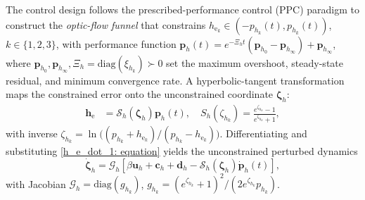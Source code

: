 The control design follows the prescribed-performance control (PPC) paradigm \cite{lin2022} to construct the \emph{optic-flow funnel} that constrains $h_{\text{e}_k}\in(-p_{h_k}(t),p_{h_k}(t))$, $k\in\{1,2,3\}$, with performance function $\boldsymbol{p}_h(t) = e^{-\Xi_h t}(\boldsymbol{p}_{h_0}-\boldsymbol{p}_{h_\infty})+\boldsymbol{p}_{h_\infty}$, where $\boldsymbol{p}_{h_0},\boldsymbol{p}_{h_\infty},\Xi_h=\text{diag}(\xi_{h_k})\succ 0$ set the maximum overshoot, steady-state residual, and minimum convergence rate. A hyperbolic-tangent transformation maps the constrained error onto the unconstrained coordinate $\boldsymbol{\zeta}_h$:
\begin{align}
    \label{optical flow error transformation: equation}
    \boldsymbol{h}_\text{e} &= \mathcal{S}_h(\boldsymbol{\zeta}_h)\boldsymbol{p}_h(t),\quad S_h(\zeta_{h_k}) = \frac{e^{\zeta_{h_k}}-1}{e^{\zeta_{h_k}}+1},
\end{align}
with inverse $\zeta_{h_k}=\ln\!\big((p_{h_k}+h_{\text{e}_k})/(p_{h_k}-h_{\text{e}_k})\big)$. Differentiating and substituting \eqref{h_e_dot_1: equation} yields the unconstrained perturbed dynamics
\begin{equation} \label{unconstrained system: equation}
    \dot{\boldsymbol{\zeta}}_h = \mathcal{G}_h\!\left[\beta\boldsymbol{u}_h + \boldsymbol{c}_h + \boldsymbol{d}_h - \mathcal{S}_h(\boldsymbol{\zeta}_h)\dot{\boldsymbol{p}}_h(t)\right],
\end{equation}
with Jacobian $\mathcal{G}_h=\text{diag}(g_{h_k})$, $g_{h_k}=(e^{\zeta_{h_k}}+1)^2/(2e^{\zeta_{h_k}}p_{h_k})$.

